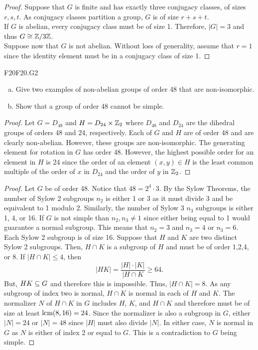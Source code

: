 \documentclass[../AlgebraQualSolutions.tex]{subfiles}
\begin{document}
	\begin{proof}
	Suppose that $G$ is finite and has exactly three conjugacy classes, of sizes $r, s, t$. As conjugacy classes partition a group, $G$ is of size $r + s + t$.\\
	
	If $G$ is abelian, every conjugacy class must be of size 1. Therefore, $|G| = 3$ and thus $G \cong \mathbb{Z}/3\mathbb{Z}$.\\
	
	Suppose now that $G$ is not abelian. Without loss of generality, assume that $r = 1$ since the identity element must be in a conjugacy class of size 1. 
	\end{proof}
	
	
	\begin{prob}{F20}{F20.G2}
	\begin{enumerate}[(a)]
	\item Give two examples of non-abelian groups of order 48 that are non-isomorphic.
	\item Show that a group of order 48 cannot be simple.
	\end{enumerate}
	\end{prob}
	
	\begin{proof}
	Let $G = D_{48}$ and $H = D_{24} \times \mathbb{Z}_2$ where $D_{48}$ and $D_{24}$ are the dihedral groups of orders 48 and 24, respectively. Each of $G$ and $H$ are of order 48 and are clearly non-abelian. However, these groups are non-isomorphic. The generating element for rotation in $G$ has order 48. However, the highest possible order for an element in $H$ is 24 since the order of an element $(x,y) \in H$ is the least common multiple of the order of $x$ in $D_{24}$ and the order of $y$ in $\mathbb{Z}_2$.
	\end{proof}
	
	\begin{proof}
	Let $G$ be of order 48. Notice that $48 = 2^4 \cdot 3$. By the Sylow Theorems, the number of Sylow 2 subgroups $n_2$ is either 1 or 3 as it must divide 3 and be equivalent to 1 modulo 2. Similarly, the number of Sylow 3 $n_3$ subgroups is either 1, 4, or 16. If $G$ is not simple than $n_2, n_3 \neq 1$ since either being equal to 1 would guarantee a normal subgroup. This means that $n_2 = 3$ and $n_3 = 4$ or $n_3 = 6$. Each Sylow 2 subgroup is of size 16. Suppose that $H$ and $K$ are two distinct Sylow 2 subgroups. Then, $H \cap K$ is a subgroup of $H$ and must be of order 1,2,4, or 8. If $|H \cap K| \leq 4$, then
	\[ |HK| = \frac{|H|\cdot|K|}{|H\cap K} \geq 64. \]
But, $HK \subseteq G$ and therefore this is impossible. Thus, $|H \cap K| = 8$. As any subgroup of index two is normal, $H \cap K$ is normal in each of $H$ and $K$. The normalizer $N$ of $H\cap K$ in $G$ includes $H$, $K$, and $H \cap K$ and therefore must be of size at least $\textrm{lcm}(8,16) = 24$. Since the normalizer is also a subgroup in $G$, either $|N| = 24$ or $|N| = 48$ since $|H|$ must also divide $|N|$. In either case, $N$ is normal in $G$ as $N$ is either of index 2 or equal to $G$. This is a contradiction to $G$ being simple.
	\end{proof}
	
\end{document}
